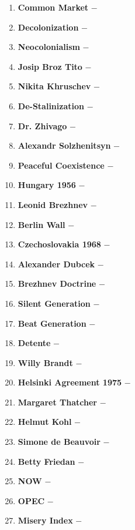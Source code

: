 \documentclass[12pt]{article}
\begin{document}
\begin{flushleft}
\begin{enumerate}
	\item \textbf{Common Market} $-$ 

	\item \textbf{Decolonization} $-$

	\item \textbf{Neocolonialism} $-$

	\item \textbf{Josip Broz Tito} $-$

	\item \textbf{Nikita Khruschev} $-$

	\item \textbf{De-Stalinization} $-$

	\item \textbf{Dr. Zhivago} $-$

	\item \textbf{Alexandr Solzhenitsyn} $-$

	\item \textbf{Peaceful Coexistence} $-$

	\item \textbf{Hungary 1956} $-$

	\item \textbf{Leonid Brezhnev} $-$

	\item \textbf{Berlin Wall} $-$

	\item \textbf{Czechoslovakia 1968} $-$

	\item \textbf{Alexander Dubcek} $-$

	\item \textbf{Brezhnev Doctrine} $-$

	\item \textbf{Silent Generation} $-$

	\item \textbf{Beat Generation} $-$

	\item \textbf{Detente} $-$

	\item \textbf{Willy Brandt} $-$

	\item \textbf{Helsinki Agreement 1975} $-$

	\item \textbf{Margaret Thatcher} $-$

	\item \textbf{Helmut Kohl} $-$

	\item \textbf{Simone de Beauvoir} $-$

	\item \textbf{Betty Friedan} $-$

	\item \textbf{NOW} $-$

	\item \textbf{OPEC} $-$

	\item \textbf{Misery Index} $-$


\end{enumerate}
\end{flushleft}
\end{document}
